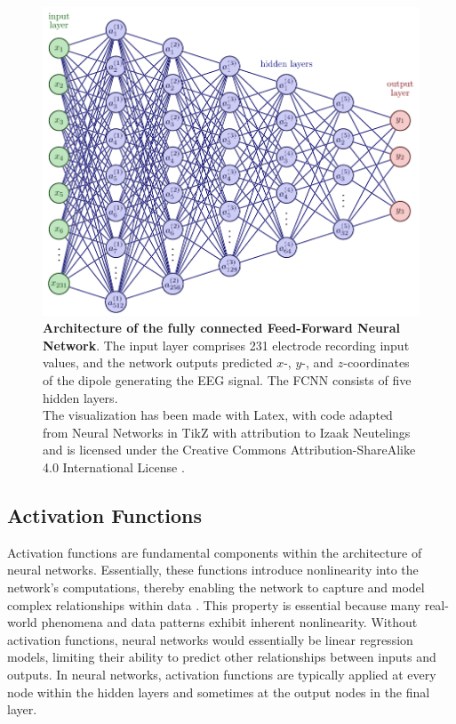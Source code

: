 \documentclass[a4paper, UKenglish, 11pt]{uiomaster}
\begin{document}
\begin{figure}[!htb]
    \centering
    \includegraphics[width=\linewidth]{figures/FFNN_architecture.pdf}
    \caption{\textbf{Architecture of the fully connected Feed-Forward Neural Network}. The input layer comprises 231 electrode recording input values, and the network outputs predicted $x$-, $y$-, and $z$-coordinates of the dipole generating the EEG signal. The FCNN consists of five hidden layers. \\
    The visualization has been made with Latex, with code adapted from Neural Networks in TikZ with attribution to Izaak Neutelings and is licensed under the Creative Commons Attribution-ShareAlike 4.0 International License \cite{neutelings2021}.}
    \label{fig:FCNN_architecture}
\end{figure}



\subsection{Activation Functions}

Activation functions are fundamental components within the architecture of neural networks. Essentially, these functions introduce nonlinearity into the network's computations, thereby enabling the network to capture and model complex relationships within data \cite{sharma2017activation}. This property is essential because many real-world phenomena and data patterns exhibit inherent nonlinearity. Without activation functions, neural networks would essentially be linear regression models, limiting their ability to predict other relationships between inputs and outputs. In neural networks, activation functions are typically applied at every node within the hidden layers and sometimes at the output nodes in the final layer.
\end{document}
